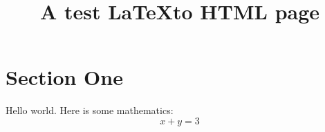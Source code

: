 \documentclass[fontsize=18pt, paper=letter]{scrartcl}
\begin{document}
	
\title{A test \LaTeX to HTML page}
\maketitle

\section{Section One}

Hello world. Here is some mathematics:
	\begin{equation}
		x + y = 3
	\end{equation}
	
\end{document}
